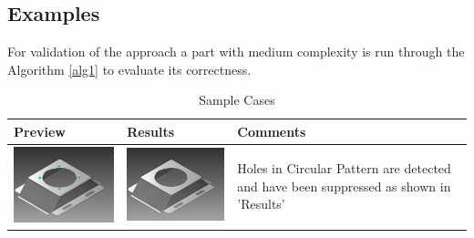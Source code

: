 \begin{longtable}{ | C{0.25\textwidth}  L{0.25\textwidth} || C{0.25\textwidth}  L{0.25\textwidth}|}
\label{DefeatTestcases}
\end{longtable}


\subsection{Examples}

For validation of the approach a part with medium complexity is run through the Algorithm \ref{alg1} to evaluate its correctness.

\begin{longtable}{ C{0.28\textwidth}  C{0.28\textwidth}  L{0.4\textwidth}}
\caption{Sample Cases}\\
\hline
{\bf Preview} & {\bf Results} & {\bf Comments} \\
\hline

\includegraphics[scale=.72]{..//Common/images//defeatmodel1.png} &
\includegraphics[scale=.72]{..//Common/images//defeatresult1.png} &
Holes in Circular Pattern are detected and have been suppressed as shown in 'Results'\\



\end{longtable}
